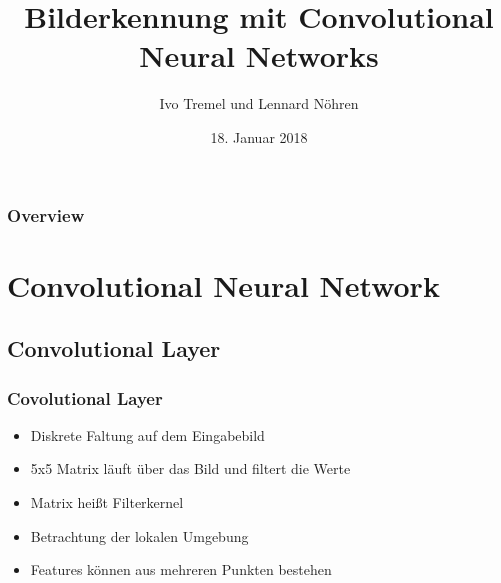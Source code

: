 \documentclass{beamer}
\title[Convolutional Neural Networks]{Bilderkennung mit Convolutional Neural Networks} %
\author{Ivo Tremel und Lennard Nöhren} %
\institute[CHI] %
{
Leibniz Universität Hannover \\ %
\medskip
}
\date{18. Januar 2018} %
\begin{document}
\begin{frame}
\titlepage %
\end{frame}

\begin{frame}
\frametitle{Overview} %
\tableofcontents %
\end{frame}


\section{Convolutional Neural Network} %

\subsection{Convolutional Layer} %

\begin{frame}
	\frametitle{Covolutional Layer}
	 \begin{itemize}
		\item Diskrete Faltung auf dem Eingabebild
		\item 5x5 Matrix läuft über das Bild und filtert die Werte
		\item Matrix heißt Filterkernel
		\item Betrachtung der lokalen Umgebung
		\item Features können aus mehreren Punkten bestehen
	\end{itemize}
	
\end{frame}
\end{document}
